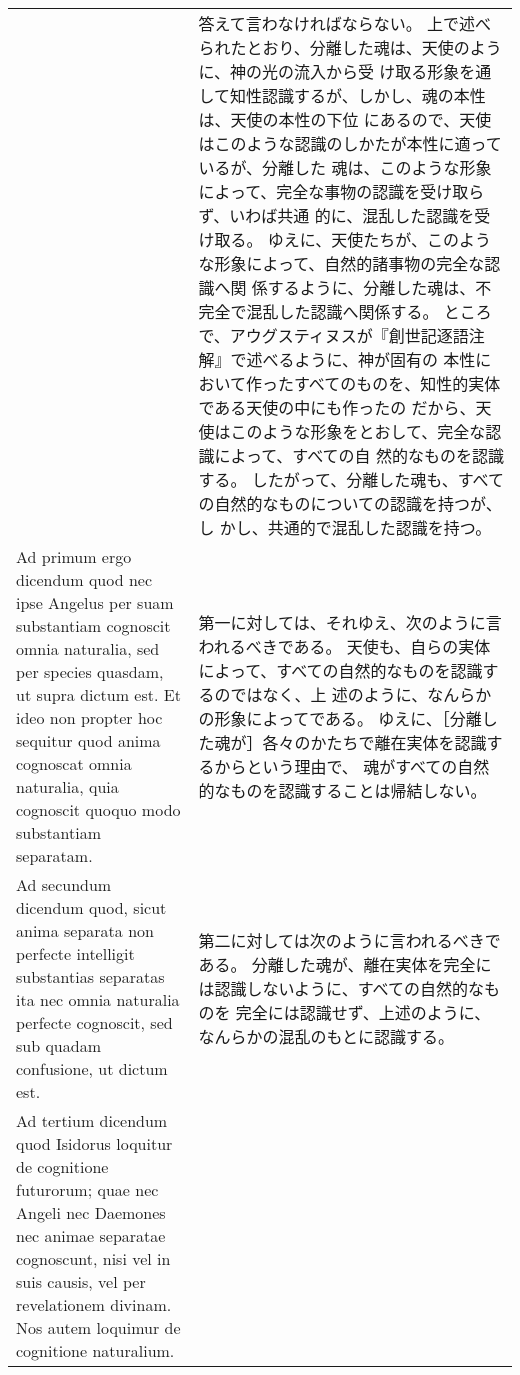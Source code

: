 \documentclass[10pt]{jsarticle} %
\begin{document}
\begin{longtable}{p{21em}p{21em}}
&

答えて言わなければならない。
上で述べられたとおり、分離した魂は、天使のように、神の光の流入から受
 け取る形象を通して知性認識するが、しかし、魂の本性は、天使の本性の下位
 にあるので、天使はこのような認識のしかたが本性に適っているが、分離した
 魂は、このような形象によって、完全な事物の認識を受け取らず、いわば共通
 的に、混乱した認識を受け取る。
ゆえに、天使たちが、このような形象によって、自然的諸事物の完全な認識へ関
 係するように、分離した魂は、不完全で混乱した認識へ関係する。
ところで、アウグスティヌスが『創世記逐語注解』で述べるように、神が固有の
 本性において作ったすべてのものを、知性的実体である天使の中にも作ったの
 だから、天使はこのような形象をとおして、完全な認識によって、すべての自
 然的なものを認識する。
したがって、分離した魂も、すべての自然的なものについての認識を持つが、し
 かし、共通的で混乱した認識を持つ。


\\




{\sc Ad primum ergo dicendum} quod nec ipse
 Angelus per suam substantiam cognoscit omnia naturalia, sed per species
 quasdam, ut supra dictum est. Et ideo non propter hoc sequitur quod
 anima cognoscat omnia naturalia, quia cognoscit quoquo modo substantiam
 separatam.

&

第一に対しては、それゆえ、次のように言われるべきである。
天使も、自らの実体によって、すべての自然的なものを認識するのではなく、上
 述のように、なんらかの形象によってである。
ゆえに、［分離した魂が］各々のかたちで離在実体を認識するからという理由で、
 魂がすべての自然的なものを認識することは帰結しない。

\\




{\sc Ad secundum dicendum} quod, sicut anima
 separata non perfecte intelligit substantias separatas ita nec omnia
 naturalia perfecte cognoscit, sed sub quadam confusione, ut dictum est.

&

第二に対しては次のように言われるべきである。
分離した魂が、離在実体を完全には認識しないように、すべての自然的なものを
 完全には認識せず、上述のように、なんらかの混乱のもとに認識する。

\\




{\sc Ad tertium dicendum} quod Isidorus loquitur
 de cognitione futurorum; quae nec Angeli nec Daemones nec animae
 separatae cognoscunt, nisi vel in suis causis, vel per revelationem
 divinam. Nos autem loquimur de cognitione naturalium.


\end{longtable}
\end{document}
